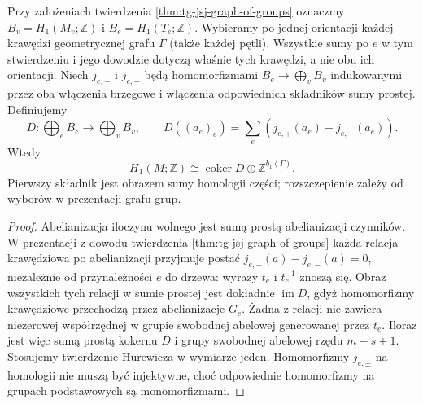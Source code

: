\begin{stwierdzenie}
\label{st:tg-jsj-h1}
Przy założeniach twierdzenia
\ref{thm:tg-jsj-graph-of-groups} oznaczmy
$B_v=H_1(M_v;\mathbb Z)$ i $B_e=H_1(T_e;\mathbb Z)$.
Wybieramy po jednej orientacji każdej krawędzi
geometrycznej grafu $\Gamma$ (także każdej pętli).
Wszystkie sumy po $e$ w tym stwierdzeniu
i jego dowodzie dotyczą właśnie tych krawędzi,
a nie obu ich orientacji.
Niech $j_{e,-}$ i $j_{e,+}$ będą homomorfizmami
$B_e\to\bigoplus_v B_v$ indukowanymi przez
oba włączenia brzegowe i włączenia odpowiednich
składników sumy prostej. Definiujemy
\[
D:\bigoplus_e B_e\longrightarrow\bigoplus_v B_v,
\qquad
D((a_e)_e)=\sum_e(j_{e,+}(a_e)-j_{e,-}(a_e)).
\]
Wtedy
\[
H_1(M;\mathbb Z)\cong
\operatorname{coker}D\oplus\mathbb Z^{b_1(\Gamma)}.
\]
Pierwszy składnik jest obrazem sumy homologii
części; rozszczepienie zależy od wyborów
w prezentacji grafu grup.
\end{stwierdzenie}
\begin{proof}
Abelianizacja iloczynu wolnego jest sumą prostą
abelianizacji czynników. W prezentacji z dowodu
twierdzenia \ref{thm:tg-jsj-graph-of-groups} każda
relacja krawędziowa po abelianizacji przyjmuje
postać $j_{e,+}(a)-j_{e,-}(a)=0$,
niezależnie od przynależności $e$ do drzewa:
wyrazy $t_e$ i $t_e^{-1}$ znoszą się.
Obraz wszystkich tych relacji w sumie prostej
jest dokładnie $\operatorname{im}D$,
gdyż homomorfizmy krawędziowe przechodzą przez
abelianizacje $G_e$. Żadna z relacji nie
zawiera niezerowej współrzędnej w grupie
swobodnej abelowej generowanej przez $t_e$.
Iloraz jest więc sumą prostą kokernu $D$
i grupy swobodnej abelowej rzędu $m-s+1$.
Stosujemy twierdzenie Hurewicza w wymiarze jeden.
Homomorfizmy $j_{e,\pm}$ na homologii nie
muszą być injektywne, choć odpowiednie
homomorfizmy na grupach podstawowych są
monomorfizmami.
\end{proof}

